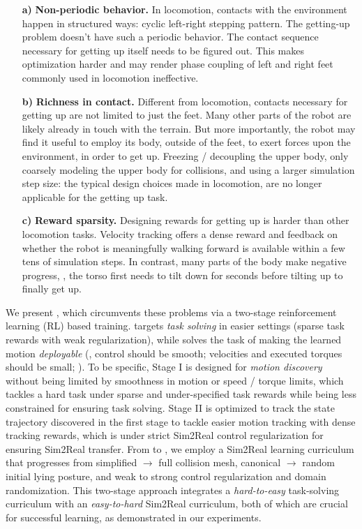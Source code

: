 \begin{itemize}
    \item[\textbf{a)}] \textbf{Non-periodic behavior.} 
    In locomotion, contacts with the environment happen in structured ways:
cyclic left-right stepping pattern. The getting-up problem doesn't have such a periodic behavior. The contact sequence necessary for getting up
itself needs to be figured out. This makes optimization harder and may render
phase coupling of left and right feet commonly used in locomotion
ineffective. 
\item[\textbf{b)}] \textbf{Richness in contact.} Different from locomotion, 
contacts necessary for getting up are not
limited to just the feet. Many other parts of the robot are likely already in
touch with the terrain. But more importantly, the robot may find it useful to
employ its body, outside of the feet, to exert forces upon the environment, in
order to get up. Freezing / decoupling the upper body, only coarsely modeling
the upper body for collisions, and using a larger simulation step size: the
typical design choices made in locomotion, are no longer applicable for the
getting up task.
\item[\textbf{c)}] 
\textbf{Reward sparsity.} Designing rewards for getting up is harder than other locomotion tasks. 
Velocity tracking offers a dense reward and feedback on
whether the robot is meaningfully walking forward is available within a few tens
of simulation steps. In contrast, many parts of the body make negative
progress, \eg, the torso first needs to tilt down for seconds before
tilting up to finally get up. 
\end{itemize}


We present \ours, which circumvents these problems via a two-stage reinforcement learning (RL) based training.
\sone targets \textit{task solving} in easier settings (sparse task rewards with weak regularization), while \stwo solves the task of making the learned motion \textit{deployable} (\ie, control should be smooth; velocities and executed torques should be small; \etc).
To be specific, Stage I is designed for \textit{motion discovery} without being 
limited by smoothness in motion or speed / torque limits, which tackles a hard task under sparse and under-specified task rewards while being less constrained for ensuring task solving.
Stage II is optimized to track the state trajectory discovered in the first stage to tackle easier motion tracking with dense tracking rewards, which is under strict Sim2Real control regularization for ensuring Sim2Real transfer.
From \sone to \stwo, we employ a Sim2Real learning curriculum that progresses from
simplified $\rightarrow$ full collision mesh,
canonical $\rightarrow$ random initial lying posture, and weak to strong control regularization and domain randomization.
This two-stage approach integrates a \textit{hard-to-easy} task-solving curriculum with an \textit{easy-to-hard} Sim2Real curriculum, both of which are crucial for successful learning, as demonstrated in our experiments.

